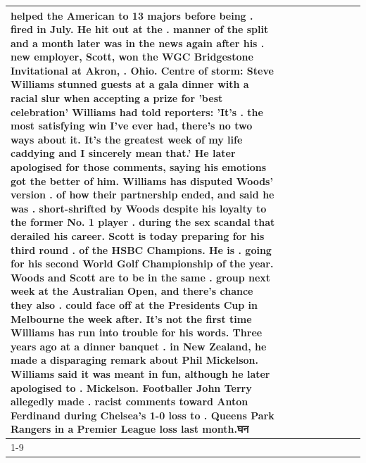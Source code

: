 \begin{table}[H]
\begin{tabular}{lllrlllll}
helped the American to 13 majors before being . fired in July. He hit out at the . manner of the split and a month later was in the news again after his . new employer, Scott, won the WGC Bridgestone Invitational at Akron, . Ohio. Centre of storm: Steve Williams stunned guests at a gala dinner with a racial slur when accepting a prize for 'best celebration' Williams had told reporters: 'It's . the most satisfying win I've ever had, there's no two ways about it. It's the greatest week of my life caddying and I sincerely mean that.' He later apologised for those comments, saying his emotions got the better of him. Williams has disputed Woods' version . of how their partnership ended, and said he was . short-shrifted by Woods despite his loyalty to the former No. 1 player . during the sex scandal that derailed his career. Scott is today preparing for his third round . of the HSBC Champions. He is . going for his second World Golf Championship of the year. Woods and Scott are to be in the same . group next week at the Australian Open, and there's chance they also . could face off at the Presidents Cup in Melbourne the week after. It's not the first time Williams has run into trouble for his words. Three years ago at a dinner banquet . in New Zealand, he made a disparaging remark about Phil Mickelson. Williams said it was meant in fun, although he later apologised to . Mickelson. Footballer John Terry allegedly made . racist comments toward Anton Ferdinand during Chelsea's 1-0 loss to . Queens Park Rangers in a Premier League loss last month.घन \\
\cline{1-9}

\end{tabular}
\end{table}
